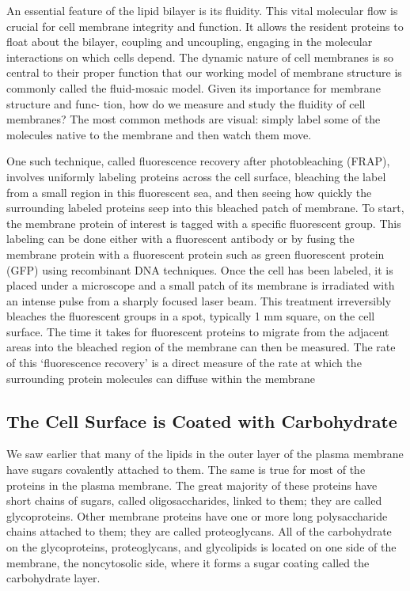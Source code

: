 An essential feature of the lipid bilayer is its fluidity. This
vital molecular flow is crucial for cell membrane integrity and function. 
It allows the resident proteins to float
about the bilayer, coupling and uncoupling, engaging in
the molecular interactions on which cells depend. The
dynamic nature of cell membranes is so central to their
proper function that our working model of membrane
structure is commonly called the fluid-mosaic model.
Given its importance for membrane structure and func-
tion, how do we measure and study the fluidity of cell
membranes? The most common methods are visual:
simply label some of the molecules native to the membrane and then watch them move.

One such technique, called fluorescence recovery after
photobleaching (FRAP), involves uniformly labeling proteins 
across the cell surface, bleaching the label from a
small region in this fluorescent sea, and then seeing how
quickly the surrounding labeled proteins seep into this
bleached patch of membrane. To start, the membrane
protein of interest is tagged with a specific fluorescent
group. This labeling can be done either with a fluorescent 
antibody or by fusing the membrane protein with
a fluorescent protein such as green fluorescent protein
(GFP) using recombinant DNA techniques.
Once the cell has been labeled, it is placed under a
microscope and a small patch of its membrane is irradiated 
with an intense pulse from a sharply focused laser
beam. This treatment irreversibly bleaches the fluorescent 
groups in a spot, typically 1 mm square, on the cell surface.
The time it takes for fluorescent
proteins to migrate from the adjacent areas into the
bleached region of the membrane can then be measured. The rate of this ‘fluorescence recovery’ is a direct
measure of the rate at which the surrounding protein
molecules can diffuse within the membrane




\subsection{The Cell Surface is Coated with Carbohydrate}

We saw earlier that many of the lipids in the outer layer of the plasma
membrane have sugars covalently attached to them. The same is true
for most of the proteins in the plasma membrane. The great majority of
these proteins have short chains of sugars, called oligosaccharides, linked
to them; they are called glycoproteins. Other membrane proteins have
one or more long polysaccharide chains attached to them; they are called
proteoglycans. All of the carbohydrate on the glycoproteins, proteoglycans,
and glycolipids is located on one side of the membrane, the noncytosolic
side, where it forms a sugar coating called the carbohydrate layer.


